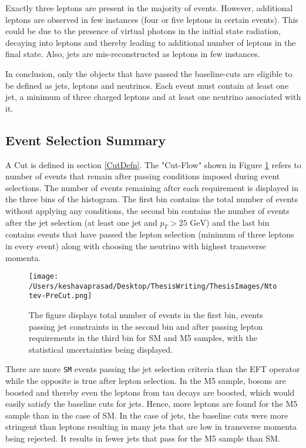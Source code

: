 Exactly three leptons are present in the majority of events. However, additional leptons are observed in few instances (four or five leptons in certain events). This could be due to the presence of  virtual photons in the initial state radiation, decaying into leptons and thereby leading to additional number of leptons in the final state. Also, jets are mis-reconstructed as leptons in few instances.


In conclusion, only the objects that have passed the baseline-cuts are eligible to be defined as jets, leptons and neutrinos. Each event must contain at least one jet, a minimum of three charged leptons and at least one neutrino associated with it.

\subsection{Event Selection Summary}
A Cut is defined in section \ref{CutDefn}. The "Cut-Flow" shown in Figure \ref{Cut flow Histogram-PreCut} refers to number of events that remain after passing conditions imposed during event selections. The number of events remaining after each requirement is displayed in the three bins of the histogram. The first bin contains the total number of events without applying any conditions, the second bin contains the number of events after the jet selection (at least one jet and $p_{T}>25 \text{ GeV}$) and the last bin contains events that have passed the lepton selection (minimum of three leptons in every event) along with choosing the neutrino with highest transverse momenta.
\begin{figure}[!h]
	\centering
	\texttt{[image: /Users/keshavaprasad/Desktop/ThesisWriting/ThesisImages/Ntotev-PreCut.png]}
	\caption{The figure displays total number of events in the first bin, events passing jet constraints in the second bin and after passing lepton requirements in the third bin for SM and M5 samples, with the statistical uncertainties being displayed.}
	\label{Cut flow Histogram-PreCut}
\end{figure}

There are more \texttt{SM} events passing the jet selection criteria than the EFT operator while the opposite is true after lepton selection. In the M5 sample, bosons are boosted and thereby even the leptons from tau decays are boosted, which would easily satisfy the baseline cuts for jets. Hence, more leptons are found for the M5 sample than in the case of SM. In the case of jets, the baseline cuts were more stringent than leptons resulting in many jets that are low in transverse momenta being rejected. It results in fewer jets that pass for the M5 sample than SM.

